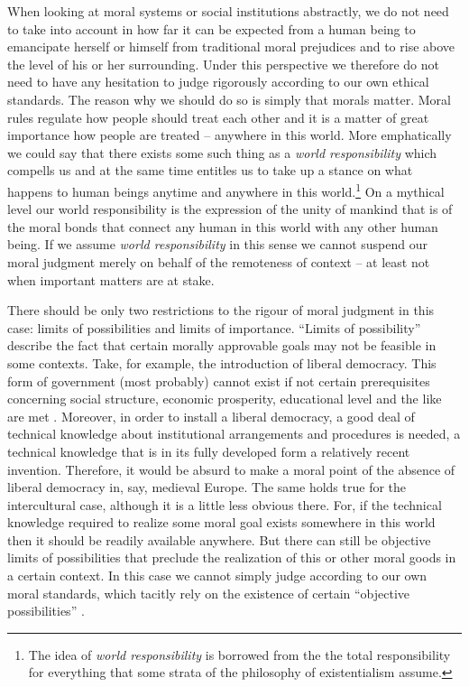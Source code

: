 \documentclass[12pt,a4paper,ngerman]{article}
\begin{document}
When looking at moral systems or social institutions abstractly, we do
not need to take into account in how far it can be expected from a
human being to emancipate herself or himself from traditional moral
prejudices and to rise above the level of his or her surrounding.
Under this perspective we therefore do not need to have any hesitation
to judge rigorously according to our own ethical standards. The reason
why we should do so is simply that morals matter. Moral rules regulate
how people should treat each other and it is a matter of great
importance how people are treated -- anywhere in this world.  More
emphatically we could say that there exists some such thing as a {\em
  world responsibility} which compells us and at the same time
entitles us to take up a stance on what happens to human beings
anytime and anywhere in this world.\footnote{The idea of {\em world
    responsibility} is borrowed from the the total responsibility for
  everything that some strata of the philosophy of existentialism
  assume.} On a mythical level our world responsibility is the
expression of the unity of mankind that is of the moral bonds that
connect any human in this world with any other human being. If we
assume {\em world responsibility} in this sense we cannot suspend our
moral judgment merely on behalf of the remoteness of context -- at
least not when important matters are at stake.

There should be only two restrictions to the rigour of moral judgment
in this case: limits of possibilities and limits of importance.
``Limits of possibility'' describe the fact that certain morally
approvable goals may not be feasible in some contexts. Take, for
example, the introduction of liberal democracy. This form of
government (most probably) cannot exist if not certain prerequisites
concerning social structure, economic prosperity, educational level
and the like are met \cite[p. 438ff.]{schmidt:2000}. Moreover, in
order to install a liberal democracy, a good deal of technical
knowledge about institutional arrangements and procedures is needed, a
technical knowledge that is in its fully developed form a relatively
recent invention.  Therefore, it would be absurd to make a moral point
of the absence of liberal democracy in, say, medieval Europe. The same
holds true for the intercultural case, although it is a little less
obvious there. For, if the technical knowledge required to realize some
moral goal exists somewhere in this world then it should be readily
available anywhere.  But there can still be objective limits of
possibilities that preclude the realization of this or other moral
goods in a certain context. In this case we cannot simply judge
according to our own moral standards, which tacitly rely on the
existence of certain ``objective possibilities'' \cite[]{weber:1906}.
\end{document}
